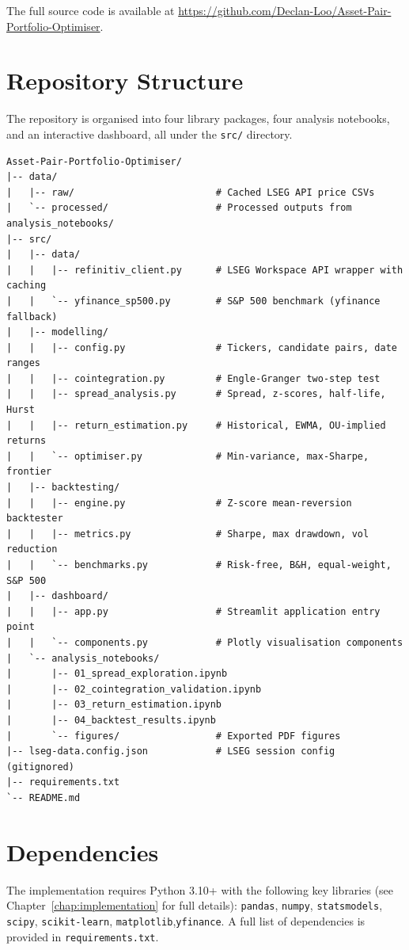 \documentclass[a4paper]{report}
\begin{document}
The full source code is available at \href{https://github.com/Declan-Loo/Asset-Pair-Portfolio-Optimiser}{https://github.com/Declan-Loo/Asset-Pair-Portfolio-Optimiser}.

\section{Repository Structure}

The repository is organised into four library packages, four analysis notebooks, and an interactive dashboard, all under the \texttt{src/} directory.

\begin{Verbatim}[fontsize=\small, baselinestretch=0.9]
Asset-Pair-Portfolio-Optimiser/
|-- data/
|   |-- raw/                         # Cached LSEG API price CSVs
|   `-- processed/                   # Processed outputs from analysis_notebooks/
|-- src/
|   |-- data/
|   |   |-- refinitiv_client.py      # LSEG Workspace API wrapper with caching
|   |   `-- yfinance_sp500.py        # S&P 500 benchmark (yfinance fallback)
|   |-- modelling/
|   |   |-- config.py                # Tickers, candidate pairs, date ranges
|   |   |-- cointegration.py         # Engle-Granger two-step test
|   |   |-- spread_analysis.py       # Spread, z-scores, half-life, Hurst
|   |   |-- return_estimation.py     # Historical, EWMA, OU-implied returns
|   |   `-- optimiser.py             # Min-variance, max-Sharpe, frontier
|   |-- backtesting/
|   |   |-- engine.py                # Z-score mean-reversion backtester
|   |   |-- metrics.py               # Sharpe, max drawdown, vol reduction
|   |   `-- benchmarks.py            # Risk-free, B&H, equal-weight, S&P 500
|   |-- dashboard/
|   |   |-- app.py                   # Streamlit application entry point
|   |   `-- components.py            # Plotly visualisation components
|   `-- analysis_notebooks/
|       |-- 01_spread_exploration.ipynb
|       |-- 02_cointegration_validation.ipynb
|       |-- 03_return_estimation.ipynb
|       |-- 04_backtest_results.ipynb
|       `-- figures/                 # Exported PDF figures
|-- lseg-data.config.json            # LSEG session config (gitignored)
|-- requirements.txt
`-- README.md
\end{Verbatim}

\section{Dependencies}

The implementation requires Python 3.10+ with the following key libraries 
(see Chapter~\ref{chap:implementation} for full details): 
\texttt{pandas}, \texttt{numpy}, \texttt{statsmodels}, \texttt{scipy}, 
\texttt{scikit-learn}, \texttt{matplotlib},\texttt{yfinance}.
A full list of dependencies is provided in \texttt{requirements.txt}.
\end{document}
